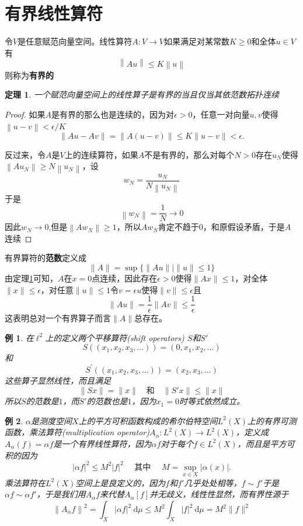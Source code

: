 \documentclass[hyperref,UTF8]{ctexbook}
\newtheorem{eg}{例}[chapter]
\newtheorem{theorem}{定理}[chapter]
\begin{document}
\section{有界线性算符}
令\(V\)是任意赋范向量空间。线性算符\(A:V\rightarrow V\)如果满足对某常数\(K\geq 0\)和全体\(u\in V\)有
\[\left\lVert Au\right\rVert\leq K\left\lVert u\right\rVert  \]
则称为\textbf{有界的}
\begin{theorem}\label{thm:13.11}
    一个赋范向量空间上的线性算子是有界的当且仅当其依范数拓扑连续
\end{theorem}
\begin{proof}
    如果\(A\)是有界的那么也是连续的，因为对\(\epsilon>0\)，任意一对向量\(u,v\)使得\(\left\lVert u-v\right\rVert <\epsilon/K\)
    $$
\|A u-A v\|=\|A(u-v)\| \leq K\|u-v\|<\epsilon .
$$

反过来，令\(A\)是\(V\)上的连续算符，如果\(A\)不是有界的，那么对每个\(N>0\)存在\(u_N\)使得\(\left\lVert A u_N\right\rVert \geq N\left\lVert u_N\right\rVert \)，设
\[ w_{N}=\frac{u_{N}}{N\left\|u_{N}\right\|} \]
于是
\[\left\|w_{N}\right\|=\frac{1}{N} \rightarrow 0\]
因此\(w_N\rightarrow 0\),但是\(\left\lVert Aw_N\right\rVert\geq 1 \)，所以\(Aw_N\)肯定不趋于\(0\)，和原假设矛盾，于是\(A\)连续
\end{proof}
有界算符的\textbf{范数}定义成
$$
\|A\|=\sup \{\|A u\| \mid\|u\| \leq 1\}
$$
由定理\ref{thm:13.11}可知，\(A\)在\(x=0\)点连续，因此存在\(\epsilon>0\)使得\(\|Ax\|\leq 1\)，对全体\(\|x\|\leq \epsilon\)，对任意\(\|u\|\leq 1\)令\(v=\epsilon u\)使得\(\|v\|\leq \epsilon\)且
$$
\|A u\|=\frac{1}{\epsilon}\|A v\| \leq \frac{1}{\epsilon}
$$
这表明总对一个有界算子而言\(\|A\|\)总存在。
\begin{eg}\label{eg:13.8}
    在\(\ell^2\)上的定义两个平移算符(shift operators) \(S\)和\(S'\)
    \[S\left(\left(x_{1}, x_{2}, x_{3}, \ldots\right)\right)=\left(0, x_{1}, x_{2}, \ldots\right) \]
    和
    \[S^{\prime}\left(\left(x_{1}, x_{2}, x_{3}, \ldots\right)\right)=\left(x_{2}, x_{3}, \ldots\right) \]
    这些算子显然线性，而且满足
    \[\|Sx\|=\|x\|\quad \text{和}\quad \|S'x\|\leq \|x\|\]
    所以\(S\)的范数是\(1\)，而\(S'\)的范数也是\(1\)，因为\(x_1=0\)时等式依然成立。
\end{eg}
\begin{eg}\label{eg:13.9}
    \(\alpha\)是测度空间\(X\)上的平方可积函数构成的希尔伯特空间\(L^2(X)\)上的有界可测函数，乘法算符(multiplication operator)\(A_\alpha:L^2(X)\rightarrow L^2(X)\)，定义成\(A_\alpha (f)=\alpha f\)是一个有界线性算符，因为\(\alpha f\)对于每个\(f\in L^2(X)\)，而且是平方可积的因为
$$
|\alpha f|^{2} \leq M^{2}|f|^{2} \quad \text { 其中 } \quad M=\sup _{x \in X}|\alpha(x)| .
$$
乘法算符在\(L^2(X)\)空间上是良定义的，因为\(f\)和\(f'\)几乎处处相等，\(f\sim f'\)于是\(\alpha f\sim \alpha f'\)，于是我们用\(A_\alpha f\)来代替\(A_\alpha [f]\)并无歧义，线性性显然，而有界性源于
$$
\left\|A_{\alpha} f\right\|^{2}=\int_{X}|\alpha f|^{2} \mathrm{~d} \mu \leq M^{2} \int_{X}|f|^{2} \mathrm{~d} \mu=M^{2}\|f\|^{2}
$$
\end{eg}
\end{document}
